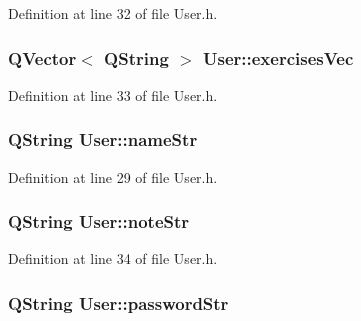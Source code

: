 Definition at line 32 of file User.\-h.

\hypertarget{class_user_ab57f1403a6cb697291cd8bc77c94918a}{
\subsubsection[{exercises\-Vec}]{\setlength{\rightskip}{0pt plus 5cm}Q\-Vector$<$ Q\-String $>$ User\-::exercises\-Vec\hspace{0.3cm}{\ttfamily [private]}}}\label{class_user_ab57f1403a6cb697291cd8bc77c94918a}


Definition at line 33 of file User.\-h.

\hypertarget{class_user_aca80d105a91d9bf8e04fccb4aed742af}{
\subsubsection[{name\-Str}]{\setlength{\rightskip}{0pt plus 5cm}Q\-String User\-::name\-Str\hspace{0.3cm}{\ttfamily [private]}}}\label{class_user_aca80d105a91d9bf8e04fccb4aed742af}


Definition at line 29 of file User.\-h.

\hypertarget{class_user_a94d574465f1be71d870dbf716ca4ffe1}{
\subsubsection[{note\-Str}]{\setlength{\rightskip}{0pt plus 5cm}Q\-String User\-::note\-Str\hspace{0.3cm}{\ttfamily [private]}}}\label{class_user_a94d574465f1be71d870dbf716ca4ffe1}


Definition at line 34 of file User.\-h.

\hypertarget{class_user_af5db2defeb3591fe79226d3fcf7393e7}{
\subsubsection[{password\-Str}]{\setlength{\rightskip}{0pt plus 5cm}Q\-String User\-::password\-Str\hspace{0.3cm}{\ttfamily [private]}}}\label{class_user_af5db2defeb3591fe79226d3fcf7393e7}


